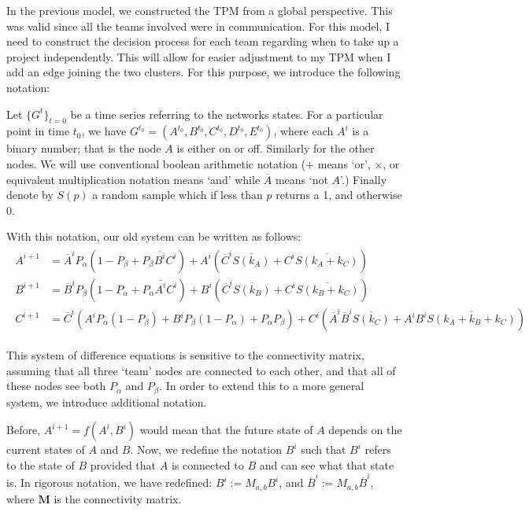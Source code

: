 In the previous model, we constructed the TPM from a global perspective. This was valid since all the teams involved were in communication. For this model, I need to construct the decision process for each team regarding when to take up a project independently. This will allow for easier adjustment to my TPM when I add an edge joining the two clusters. For this purpose, we introduce the following notation:

Let $\{G^t\}_{t=0}$ be a time series referring to the networks states. For a particular point in time $t_0$, we have $G^{t_0} = (A^{t_0}, B^{t_0}, C^{t_0}, D^{t_0}, E^{t_0})$, where each $A^{i}$ is a binary number; that is the node $A$ is either on or off. Similarly for the other nodes. We will use conventional boolean arithmetic notation ($+$ means `or', $\times$, or equivalent multiplication notation means `and' while $\overline{A}$ means `not $A$'.) Finally denote by $S(p)$ a random sample which if less than $p$ returns a 1, and otherwise 0.

With this notation, our old system can be written as follows:
\begin{align}
\begin{split}
\label{eq:transition_old}
A^{i+1} &= \overline{A}^{i} P_\alpha \left(1-P_\beta + P_\beta \overline{B^i} C^i\right)+ A^i \left(\overline{C}^i\overline{S(k_A)} + C^i \overline{S(k_A+k_C)}\right)\\
B^{i+1} &= \overline{B}^{i} P_\beta \left(1-P_\alpha + P_\alpha \overline{A^i} C^i\right)+ B^i \left(\overline{C}^i\overline{S(k_B)} + C^i \overline{S(k_B+k_C)}\right)\\
C^{i+1}&= \overline{C}^i\left(A^i P_\alpha(1-P_\beta) + B^i P_\beta(1-P_\alpha) + P_\alpha P_\beta \right) + C^i\left(\overline{A}^i\overline{B}^i\overline{S(k_C)} +A^i B^i \overline{S(k_A+k_B+k_C)}\right)
\end{split}
\end{align}

This system of difference equations is sensitive to the connectivity matrix, assuming that all three `team' nodes are connected to each other, and that all of these nodes see both $P_\alpha$ and $P_\beta$. In order to extend this to a more general system, we introduce additional notation. 

Before, $A^{i+1} = f(A^i, B^i)$ would mean that the future state of $A$ depends on the current states of $A$ and $B$. Now, we redefine the notation $B^i$ such that $B^i$ refers to the state of $B$ provided that $A$ is connected to $B$ and can see what that state is. In rigorous notation, we have redefined: $B^i := M_{a,b}B^i$, and $\overline{B}^i :=M_{a,b}\overline{B}^i$, where $\mathbf{M}$ is the connectivity matrix.

